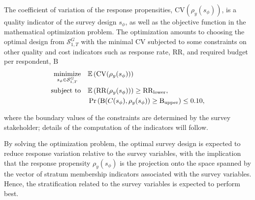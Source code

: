 \documentclass[12pt]{article}
\begin{document}
The coefficient of variation of the response propensities, $\mathrm{CV}(\rho_y(s_\phi))$, is a quality indicator of the survey design $s_\phi$, as well as the objective function in the mathematical optimization problem.
The optimization amounts to choosing the optimal design from $\mathcal{S}^G_{1,T}$ with the minimal $\mathrm{CV}$ subjected to some constraints on other quality and cost indicators such as response rate, $\mathrm{RR}$, and required budget per respondent, $\mathrm{B}$
\let\saveeqnno\theequation
\let\savefrac\frac
\def\dispfrac{\displaystyle\savefrac}
\begin{eqnarray*}
\let\frac\dispfrac
\gdef\theequation{}
\let\theHequation\theequation
\begin{aligned}
	\underset{s_\phi \in \mathcal{S}^G_{1,T}}{\mathrm{minimize}} \quad & \mathbb{E}\left(\mathrm{CV}(\rho_y(s_\phi))\right) \\
	\mathrm{subject~to} \quad & \mathbb{E}\left(\mathrm{RR}(\rho_y(s_\phi))\right) \geq \mathrm{RR}_{\mathrm{lower}}, \\
	& \Pr\left(\mathrm{B}(C(s_\phi),\rho_y(s_\phi))\geq \mathrm{B}_{\mathrm{upper}}\right) \leq 0.10,
\end{aligned}
\end{eqnarray*}
\global\let\theequation\saveeqnno
\addtocounter{equation}{-1}\ignorespaces

where the boundary values of the constraints are determined by the survey stakeholder; details of the computation of the indicators will follow.

By solving the optimization problem, the optimal survey design is expected to reduce response variation relative to the survey variables, with the implication that the response propensity $\rho_y(s_\phi)$ is the projection onto the space spanned by the vector of stratum membership indicators associated with the survey variables.
Hence, the stratification related to the survey variables is expected to perform best.

\end{document}
